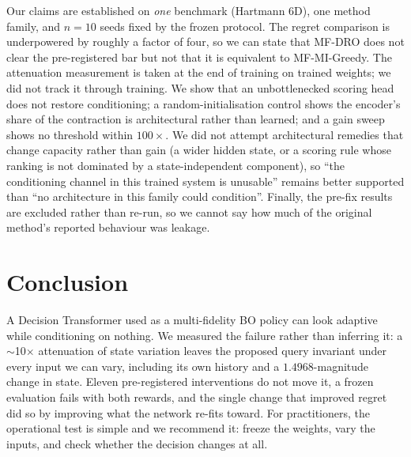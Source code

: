 \documentclass[11pt]{article}
\begin{document}
Our claims are established on \emph{one} benchmark (Hartmann 6D), one method
family, and $n{=}10$ seeds fixed by the frozen protocol. The regret comparison
is underpowered by roughly a factor of four, so we can state that MF-DRO does
not clear the pre-registered bar but not that it is equivalent to MF-MI-Greedy.
The attenuation measurement is taken at the end of training on trained weights;
we did not track it through training. We show that an unbottlenecked scoring
head does not restore conditioning; a random-initialisation control shows the
encoder's share of the contraction is architectural rather than learned; and a
gain sweep shows no threshold within $100\times$. We did not attempt
architectural remedies that change capacity rather than gain (a wider hidden
state, or a scoring rule whose ranking is not dominated by a state-independent
component), so ``the conditioning channel in this trained system is unusable''
remains better supported than ``no architecture in this family could
condition''.
Finally, the pre-fix results are excluded rather than re-run, so we cannot say
how much of the original method's reported behaviour was leakage.

\section{Conclusion}

A Decision Transformer used as a multi-fidelity BO policy can look adaptive
while conditioning on nothing. We measured the failure rather than inferring it:
a $\sim$10$\times$ attenuation of state variation leaves the proposed query
invariant under every input we can vary, including its own history and a
$1.4968$-magnitude change in state. Eleven pre-registered interventions do not
move it, a frozen evaluation fails with both rewards, and the single change that
improved regret did so by improving what the network re-fits toward. For
practitioners, the operational test is simple and we recommend it: freeze the
weights, vary the inputs, and check whether the decision changes at all.



\end{document}
